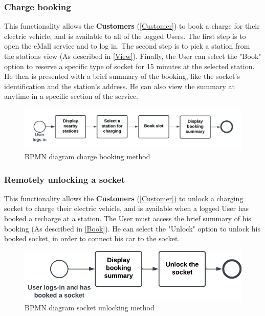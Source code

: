 \subsubsection{Charge booking}
This functionality allows the \textbf{Customers} (\ref{Customer}) to book a charge for their electric vehicle, and is available to all of the logged Users. 
The first step is to open the eMall service and to log in. The second step is to pick a station from the stations view (As described in \ref{View}).
Finally, the User can select the "Book" option to reserve a specific type of socket for 15 minutes at the selected station.
He then is presented with a brief summary of the booking, like the socket's identification and the station's address.
He can also view the summary at anytime in a specific section of the service.\label{Book} 
\begin{figure}[H]
    \begin{center}
        \includegraphics[width=\textwidth]{img/fun-book-slot.png}
        \caption{BPMN diagram charge booking method}
    \end{center}
\end{figure}
\subsubsection{Remotely unlocking a socket}
This functionality allows the \textbf{Customers} (\ref{Customer}) to unlock a charging socket to charge their electric vehicle, and is available when a logged User has booked a recharge at a station. 
The User must access the brief summary of his booking (As described in \ref{Book}).
He can select the "Unlock" option to unlock his booked socket, in order to connect his car to the socket.
\begin{figure}[H]
    \begin{center}
        \includegraphics[scale=0.3]{img/fun-sock-unl.png}
        \caption{BPMN diagram socket unlocking method}
    \end{center}
\end{figure}
